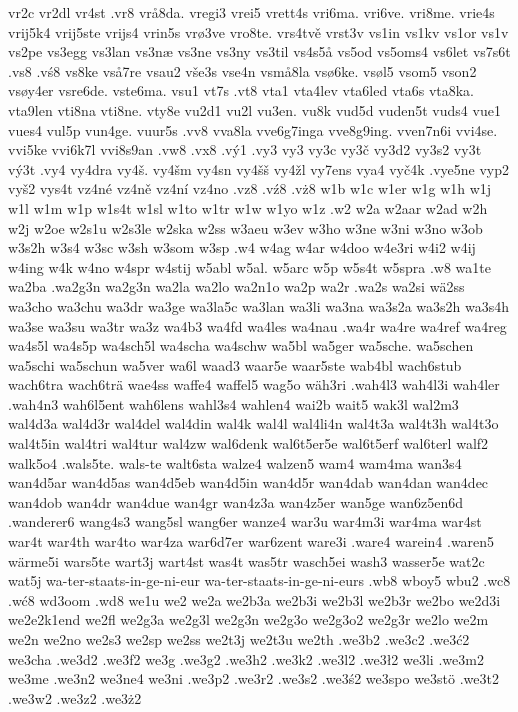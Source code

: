 {{vr2c
vr2dl
vr4st
.vr8
vrå8da.
vregi3
vrei5
vrett4s
vri6ma.
vri6ve.
vri8me.
vrie4s
vrij5k4
vrij5ste
vrijs4
vrin5s
vrø3ve
vro8te.
vrs4tvě
vrst3v
vs1in
vs1kv
vs1or
vs1v
vs2pe
vs3egg
vs3lan
vs3næ
vs3ne
vs3ny
vs3til
vs4s5å
vs5od
vs5oms4
vs6let
vs7s6t
.vs8
.vś8
vs8ke
vså7re
vsau2
vše3s
vse4n
vsmå8la
vsø6ke.
vsøl5
vsom5
vson2
vsøy4er
vsre6de.
vste6ma.
vsu1
vt7s
.vt8
vta1
vta4lev
vta6led
vta6s
vta8ka.
vta9len
vti8na
vti8ne.
vty8e
vu2d1
vu2l
vu3en.
vu8k
vud5d
vuden5t
vuds4
vue1
vues4
vul5p
vun4ge.
vuur5s
.vv8
vva8la
vve6g7inga
vve8g9ing.
vven7n6i
vvi4se.
vvi5ke
vvi6k7l
vvi8s9an
.vw8
.vx8
.vý1
.vy3
vy3
vy3c
vy3č
vy3d2
vy3s2
vy3t
vý3t
.vy4
vy4dra
vy4š.
vy4šm
vy4sn
vy4šš
vy4žl
vy7ens
vya4
vyč4k
.vye5ne
vyp2
vyš2
vys4t
vz4né
vz4ně
vz4ní
vz4no
.vz8
.vź8
.vż8
w1b
w1c
w1er
w1g
w1h
w1j
w1l
w1m
w1p
w1s4t
w1sl
w1to
w1tr
w1w
w1yo
w1z
.w2
w2a
w2aar
w2ad
w2h
w2j
w2oe
w2s1u
w2s3le
w2ska
w2ss
w3aeu
w3ev
w3ho
w3ne
w3ni
w3no
w3ob
w3s2h
w3s4
w3sc
w3sh
w3som
w3sp
.w4
w4ag
w4ar
w4doo
w4e3ri
w4i2
w4ij
w4ing
w4k
w4no
w4spr
w4stij
w5abl
w5al.
w5arc
w5p
w5s4t
w5spra
.w8
wa1te
wa2ba
.wa2g3n
wa2g3n
wa2la
wa2lo
wa2n1o
wa2p
wa2r
.wa2s
wa2si
wä2ss
wa3cho
wa3chu
wa3dr
wa3ge
wa3la5c
wa3lan
wa3li
wa3na
wa3s2a
wa3s2h
wa3s4h
wa3se
wa3su
wa3tr
wa3z
wa4b3
wa4fd
wa4les
wa4nau
.wa4r
wa4re
wa4ref
wa4reg
wa4s5l
wa4s5p
wa4sch5l
wa4scha
wa4schw
wa5bl
wa5ger
wa5sche.
wa5schen
wa5schi
wa5schun
wa5ver
wa6l
waad3
waar5e
waar5ste
wab4bl
wach6stub
wach6tra
wach6trä
wae4ss
waffe4
waffel5
wag5o
wäh3ri
.wah4l3
wah4l3i
wah4ler
.wah4n3
wah6l5ent
wah6lens
wahl3s4
wahlen4
wai2b
wait5
wak3l
wal2m3
wal4d3a
wal4d3r
wal4del
wal4din
wal4k
wal4l
wal4li4n
wal4t3a
wal4t3h
wal4t3o
wal4t5in
wal4tri
wal4tur
wal4zw
wal6denk
wal6t5er5e
wal6t5erf
wal6terl
walf2
walk5o4
.wals5te.
wals-te
walt6sta
walze4
walzen5
wam4
wam4ma
wan3s4
wan4d5ar
wan4d5as
wan4d5eb
wan4d5in
wan4d5r
wan4dab
wan4dan
wan4dec
wan4dob
wan4dr
wan4due
wan4gr
wan4z3a
wan4z5er
wan5ge
wan6z5en6d
.wanderer6
wang4s3
wang5sl
wang6er
wanze4
war3u
war4m3i
war4ma
war4st
war4t
war4th
war4to
war4za
war6d7er
war6zent
ware3i
.ware4
warein4
.waren5
wärme5i
wars5te
wart3j
wart4st
was4t
was5tr
wasch5ei
wash3
wasser5e
wat2c
wat5j
wa-ter-staats-in-ge-ni-eur
wa-ter-staats-in-ge-ni-eurs
.wb8
wboy5
wbu2
.wc8
.wć8
wd3oom
.wd8
we1u
we2
we2a
we2b3a
we2b3i
we2b3l
we2b3r
we2bo
we2d3i
we2e2k1end
we2fl
we2g3a
we2g3l
we2g3n
we2g3o
we2g3o2
we2g3r
we2lo
we2m
we2n
we2no
we2s3
we2sp
we2ss
we2t3j
we2t3u
we2th
.we3b2
.we3c2
.we3ć2
we3cha
.we3d2
.we3f2
we3g
.we3g2
.we3h2
.we3k2
.we3l2
.we3ł2
we3li
.we3m2
we3me
.we3n2
we3ne4
we3ni
.we3p2
.we3r2
.we3s2
.we3ś2
we3spo
we3stö
.we3t2
.we3w2
.we3z2
.we3ż2
}}
